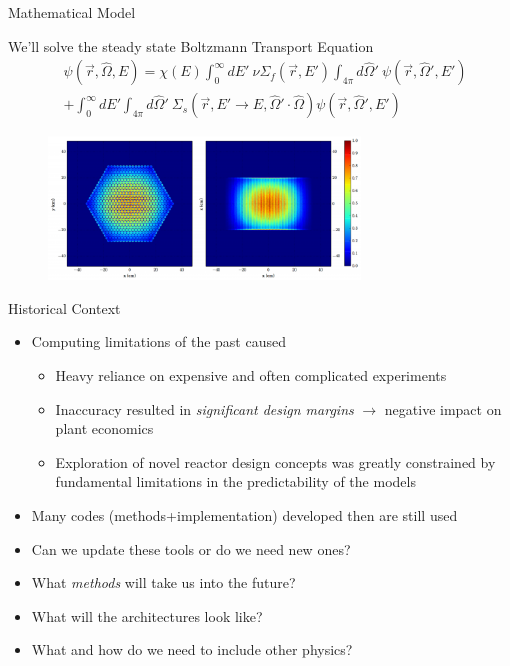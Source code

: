 \documentclass[xcolor=x11names,compress, handout]{beamer}
\renewcommand{\(}{\begin{columns}}
\renewcommand{\)}{\end{columns}}
\newcommand{\<}[1]{\begin{column}{#1}}
\renewcommand{\>}{\end{column}}
\newcommand{\Macro}{\ensuremath{\Sigma}}
\newcommand{\vOmega}{\ensuremath{\hat{\Omega}}}
\begin{document}
\begin{frame}{Mathematical Model}

We'll solve the steady state Boltzmann Transport Equation
\vspace{-.5em}
\begin{align}
  [\vOmega \cdot \nabla + \Macro(\vec{r}, E)] &\psi(\vec{r}, \vOmega, E)  = \chi(E) \int_0^{\infty} dE' \:\nu \Macro_{f}(\vec{r}, E') \int_{4\pi} d\vOmega' \:\psi(\vec{r}, \vOmega', E')  \nonumber \\
   &+ \int_0^{\infty} dE' \int_{4\pi} d\vOmega' \:\Macro_{s}(\vec{r}, E' \to E, \vOmega' \cdot \vOmega) \psi(\vec{r}, \vOmega', E')  \nonumber
\end{align}
\vspace{-1.5em}
    \begin{figure}
    \includegraphics[height=1.5in,clip]{FissionSourceDistribution}
    \end{figure}

\end{frame}


\begin{frame}{Historical Context}
\begin{itemize}
\item Computing limitations of the past caused
\begin{itemize}
\item Heavy reliance on expensive and often complicated experiments
\item Inaccuracy resulted in \emph{significant design margins} $\rightarrow$ negative impact on plant economics
\item Exploration of novel reactor design concepts was greatly constrained by fundamental limitations in the predictability of the models
\vspace*{1 em}
\end{itemize}
\item Many codes (methods+implementation) developed then are still used 
\pause
\item Can we update these tools or do we need new ones?
\pause
\item What \textit{methods} will take us into the future?
\pause
\item What will the architectures look like?
\pause
\item What and how do we need to include other physics?
\end{itemize}
\end{frame}
\end{document}
